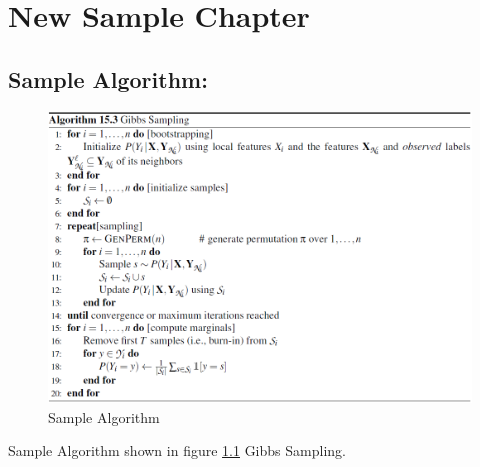 
\chapter{New Sample Chapter}

\section{Sample Algorithm:}

				\begin{figure}[h!]
					\centering
					\begin{minipage}[b]{0.80\linewidth}
               \includegraphics[scale=0.6]{sample_algo}
                \caption{Sample Algorithm}						
                \label{fig:algo1}
                \end{minipage}
                \end{figure}
                
    
 Sample Algorithm shown in figure \ref{fig:algo1} Gibbs Sampling.